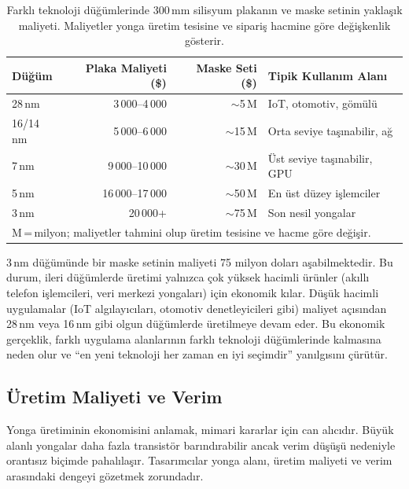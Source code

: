 \begin{table}[ht!]
\centering
\caption[Teknoloji düğümlerine göre üretim maliyetleri]{Farklı teknoloji düğümlerinde 300\,mm silisyum plakanın ve maske setinin yaklaşık maliyeti. Maliyetler yonga üretim tesisine ve sipariş hacmine göre değişkenlik gösterir.}
\label{tab:plaka-maliyetleri}
\footnotesize
\begin{tabular}{lrrl}
\toprule
\textbf{Düğüm} & \textbf{Plaka Maliyeti (\$)} & \textbf{Maske Seti (\$)} & \textbf{Tipik Kullanım Alanı} \\
\midrule
28\,nm    & 3\,000--4\,000     & ${\sim}$5\,M    & IoT, otomotiv, gömülü \\
16/14\,nm & 5\,000--6\,000     & ${\sim}$15\,M   & Orta seviye taşınabilir, ağ \\
7\,nm     & 9\,000--10\,000    & ${\sim}$30\,M   & Üst seviye taşınabilir, GPU \\
5\,nm     & 16\,000--17\,000   & ${\sim}$50\,M   & En üst düzey işlemciler \\
3\,nm     & 20\,000+           & ${\sim}$75\,M   & Son nesil yongalar \\
\bottomrule
\multicolumn{4}{l}{\scriptsize M\,=\,milyon; maliyetler tahmini olup üretim tesisine ve hacme göre değişir.}
\end{tabular}
\end{table}

3\,nm düğümünde bir maske setinin maliyeti 75 milyon doları aşabilmektedir. Bu durum, ileri düğümlerde üretimi yalnızca çok yüksek hacimli ürünler (akıllı telefon işlemcileri, veri merkezi yongaları) için ekonomik kılar. Düşük hacimli uygulamalar (IoT algılayıcıları, otomotiv denetleyicileri gibi) maliyet açısından 28\,nm veya 16\,nm gibi olgun düğümlerde üretilmeye devam eder. Bu ekonomik gerçeklik, farklı uygulama alanlarının farklı teknoloji düğümlerinde kalmasına neden olur ve ``en yeni teknoloji her zaman en iyi seçimdir'' yanılgısını çürütür.


\subsection{Üretim Maliyeti ve Verim}
\label{sec:maliyet-verim}

Yonga üretiminin ekonomisini anlamak, mimari kararlar için can alıcıdır. Büyük alanlı yongalar daha fazla transistör barındırabilir ancak verim düşüşü nedeniyle orantısız biçimde pahalılaşır. Tasarımcılar yonga alanı, üretim maliyeti ve verim arasındaki dengeyi gözetmek zorundadır.

